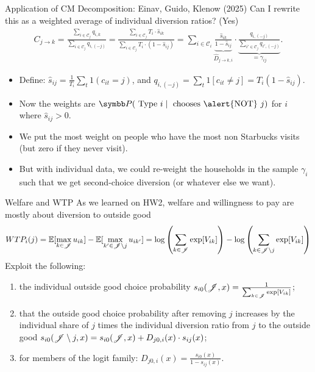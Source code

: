 \documentclass[aspectratio=169,10pt]{beamer}
\begin{document}
\begin{frame}{Application of CM Decomposition: Einav, Guido, Klenow (2025)}
Can I rewrite this as a weighted average of \alert{individual diversion ratios}? (Yes)
\begin{align*}
C_{j \rightarrow k}
=\frac{\sum_{i \in \mathcal{C}_j} q_{i,k}}{\sum_{i \in \mathcal{C}_j} q_{i,(-j)}} 
= \frac{\sum_{i \in \mathcal{C}_j}   T_i \cdot \hat{s}_{ik} }{\sum_{i \in \mathcal{C}_j}  T_i \cdot (1-\hat{s}_{ij}) } 
= \sum_{i \in \mathcal{C}_i} \underbrace{\frac{\hat{s}_{ik}}{1-\hat{s}_{ij}}}_{\hat{D}_{j \rightarrow k, i}} \cdot \underbrace{\frac{q_{i,(-j)}}{\sum_{i' \in \mathcal{C}_j} q_{i',(-j)}}}_{=\gamma_{ij}}.
\end{align*}
\begin{itemize}
    \item Define: $\hat{s}_{ij} = \frac{1}{T_i} \sum_t 1(c_{it} =j)$, and $q_{i,(-j)} = \sum_{t} 1 [c_{it} \neq j] =  T_i (1- \hat{s}_{ij})$. 
    \item Now the weights are $\Pr( \text{ Type } i  \mid \text{ chooses \alert{NOT} } j)$ for $i$ where $\hat{s}_{ij} > 0$.
    \item We put the most weight on people who have the most \alert{non Starbucks} visits\\
    (but zero if they never visit).
    \item But with individual data, we could re-weight the households in the sample $\gamma_i$ such that we get \alert{second-choice diversion} (or whatever else we want).
\end{itemize}
\end{frame}


\begin{frame}{Welfare and WTP}
As we learned on HW2, welfare and willingness to pay are mostly about \alert{diversion to outside good}
\begin{align*}
WTP_i(j) = \mathbb{E}[\max_{k \in \mathscr{J}} u_{ik}]  - \mathbb{E}[\max_{k' \in \mathscr{J}\setminus j} u_{ik'} ] =  \log \left( \sum_{k \in \mathscr{J}} \exp[V_{ik}] \right)-  \log \left(\sum_{k \in \mathscr{J} \setminus j} \exp[V_{ik}]\right)
\end{align*}
Exploit the following:
\begin{enumerate}
 \item the individual outside good choice probability $s_{i0}(\mathscr{J},x) = \frac{1}{ \sum_{k \in \mathscr{J}} \exp[V_{ik}]}$;
 \item  that the outside good choice probability after removing $j$ increases by the individual share of $j$ times the individual diversion ratio from $j$ to the outside good $s_{i0}(\mathscr{J}\setminus j,x)  = s_{i0}(\mathscr{J},x) + D_{j0,i}(x) \cdot s_{ij}(x)$; 
 \item for members of the logit family: $D_{j0,i}(x) = \frac{s_{i0}(x)}{1-s_{ij}(x)}$. 
\end{enumerate}
\end{frame}
\end{document}
